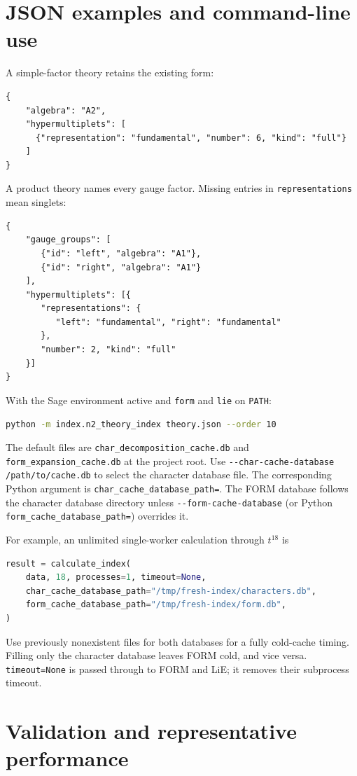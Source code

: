 \documentclass[11pt,a4paper]{article}
\newcommand{\code}[1]{{\small\nolinkurl{#1}}}
\begin{document}
\section{JSON examples and command-line use}\label{sec:json}
A simple-factor theory retains the existing form:
\begin{lstlisting}
{
    "algebra": "A2",
    "hypermultiplets": [
      {"representation": "fundamental", "number": 6, "kind": "full"}
    ]
}
\end{lstlisting}
A product theory names every gauge factor. Missing entries in
\code{representations} mean singlets:
\begin{lstlisting}
{
    "gauge_groups": [
       {"id": "left", "algebra": "A1"},
       {"id": "right", "algebra": "A1"}
    ],
    "hypermultiplets": [{
       "representations": {
          "left": "fundamental", "right": "fundamental"
       },
       "number": 2, "kind": "full"
    }]
}
\end{lstlisting}
With the Sage environment active and \code{form} and \code{lie} on \code{PATH}:
\begin{lstlisting}[language=bash]
python -m index.n2_theory_index theory.json --order 10
\end{lstlisting}
The default files are \code{char_decomposition_cache.db} and
\code{form_expansion_cache.db} at the project root.
Use \code{--char-cache-database} \code{/path/to/cache.db} to select the character
database file. The corresponding Python argument is
\code{char_cache_database_path=}. The FORM database
follows the character database directory unless \code{--form-cache-database}
(or Python \code{form_cache_database_path=}) overrides it.

For example, an unlimited single-worker calculation through $t^{18}$ is
\begin{lstlisting}[language=Python]
result = calculate_index(
    data, 18, processes=1, timeout=None,
    char_cache_database_path="/tmp/fresh-index/characters.db",
    form_cache_database_path="/tmp/fresh-index/form.db",
)
\end{lstlisting}
Use previously nonexistent files for both databases for a fully cold-cache
timing. Filling only the character database leaves FORM cold, and vice versa. \code{timeout=None}
is passed through to FORM and LiE; it removes their subprocess timeout.

\clearpage
\section{Validation and representative performance}\label{sec:validation}
\end{document}
